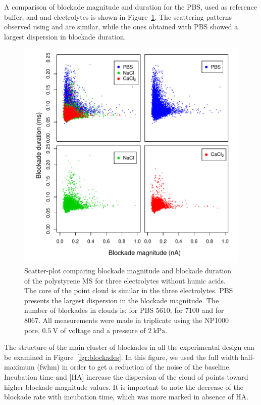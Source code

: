 \documentclass[journal=langd5,manuscript=article]{achemso}
\begin{document}
A comparison of blockade magnitude and duration for the PBS, used as reference  buffer, and  and  electrolytes is shown in Figure~\ref{fgr:pairs_buffers}.
The scattering patterns observed using    and  are similar, while the ones obtained with PBS showed a largest dispersion in blockade duration.
 \begin{figure}
  \includegraphics[width=\linewidth]{Figures/Raw_Pairs_buffers_MS_T0_Fwhm.pdf}
  \caption{Scatter-plot comparing  blockade magnitude and
  blockade duration of  the polystyrene MS for three
  electrolytes without humic acids. The core of the point cloud is similar in the three electrolytes. PBS  presents the largest dispersion in the blockade magnitude. The number of blockades in clouds is: for PBS 5610; for  7100 and for  8067. All measurements were made in triplicate using the NP1000 pore, $0.5~\mathrm{V}$ of voltage and a pressure of $2~\mathrm{kPa}$.} 
  \label{fgr:pairs_buffers}
\end{figure}






The  structure of the main cluster of blockades in all the experimental design can be examined in Figure~\ref{fgr:blockades}. In this figure, we used the full width half-maximum (fwhm) in order to get a reduction of the noise of the baseline. Incubation time and [HA]  increase the dispersion of the cloud of points toward higher blockade magnitude values. It is important to note the decrease of the blockade rate with incubation time, which was more marked in absence of HA.
\end{document}
